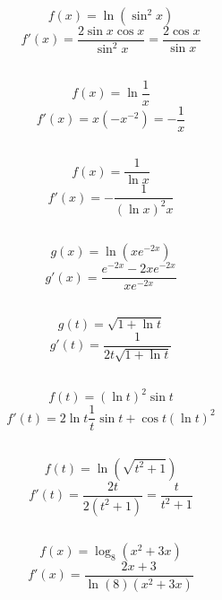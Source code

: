 \documentclass[11pt,oneside,titlepage]{book}
\begin{document}
$$f(x) = \ln (\sin^2 x)$$
$$f'(x) = \frac{2 \sin x \cos x}{ \sin^2 x } = \frac{2 \cos x}{ \sin x }$$

\subsection{}

$$f(x) = \ln \frac 1 x$$
$$f'(x) = x (- x^{-2}) = - \frac{1}{x}$$

\subsection{}

$$f(x) = \frac{1}{\ln x}$$
$$f'(x) = - \frac{1}{(\ln x)^2 x} $$

\subsection{}

$$g(x) = \ln (x e^{-2x})$$
$$g'(x) = \frac{e^{-2x} -2xe^{-2x}}{x e^{-2x}}$$

\subsection{}

$$g(t) = \sqrt{1 + \ln t}$$
$$g'(t) = \frac{1}{2t \sqrt{1 + \ln t} }$$

\subsection{}

$$f(t) = (\ln t)^2 \sin t$$
$$f'(t) = 2 \ln t \frac 1 t \sin t + \cos t (\ln t)^2$$

\subsection{}

$$f(t) = \ln (\sqrt{t^2 + 1})$$
$$f'(t) = \frac{2t}{2( t^2 + 1)} = \frac{t}{t^2 + 1}$$

\subsection{}

$$f(x) = \log_8{(x^2 + 3x)}$$
$$f'(x) = \frac{2x + 3}{\ln (8) (x^2 + 3x)}$$

\subsection{}


 
\end{document}
